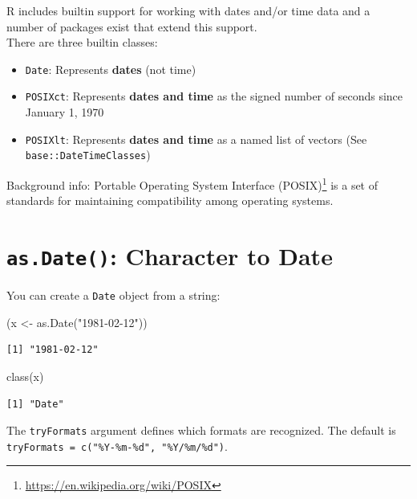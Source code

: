 \documentclass[
]{book}
\newenvironment{Shaded}{\begin{snugshade}}{\end{snugshade}}
\newcommand{\FunctionTok}[1]{\textcolor[rgb]{0.00,0.00,0.00}{#1}}
\newcommand{\NormalTok}[1]{#1}
\newcommand{\OtherTok}[1]{\textcolor[rgb]{0.56,0.35,0.01}{#1}}
\newcommand{\StringTok}[1]{\textcolor[rgb]{0.31,0.60,0.02}{#1}}
\providecommand{\tightlist}{%
  \setlength{\itemsep}{0pt}\setlength{\parskip}{0pt}}
\renewcommand{\href}[2]{#2\footnote{\url{#1}}}
\begin{document}
R includes builtin support for working with dates and/or time data and a number of packages exist that extend this support.\\
There are three builtin classes:

\begin{itemize}
\tightlist
\item
  \texttt{Date}: Represents \textbf{dates} (not time)
\item
  \texttt{POSIXct}: Represents \textbf{dates and time} as the signed number of seconds since January 1, 1970
\item
  \texttt{POSIXlt}: Represents \textbf{dates and time} as a named list of vectors (See \texttt{base::DateTimeClasses})
\end{itemize}

Background info: \href{https://en.wikipedia.org/wiki/POSIX}{Portable Operating System Interface (POSIX)} is a set of standards for maintaining compatibility among operating systems.

\hypertarget{as.date-character-to-date}{%
\section{\texorpdfstring{\texttt{as.Date()}: Character to Date}{as.Date(): Character to Date}}\label{as.date-character-to-date}}

You can create a \texttt{Date} object from a string:

\begin{Shaded}
\begin{Highlighting}[]
\NormalTok{(x }\OtherTok{\textless{}{-}} \FunctionTok{as.Date}\NormalTok{(}\StringTok{"1981{-}02{-}12"}\NormalTok{))}
\end{Highlighting}
\end{Shaded}

\begin{verbatim}
[1] "1981-02-12"
\end{verbatim}

\begin{Shaded}
\begin{Highlighting}[]
\FunctionTok{class}\NormalTok{(x)}
\end{Highlighting}
\end{Shaded}

\begin{verbatim}
[1] "Date"
\end{verbatim}

The \texttt{tryFormats} argument defines which formats are recognized. The default is \texttt{tryFormats\ =\ c("\%Y-\%m-\%d",\ "\%Y/\%m/\%d")}.
\end{document}
